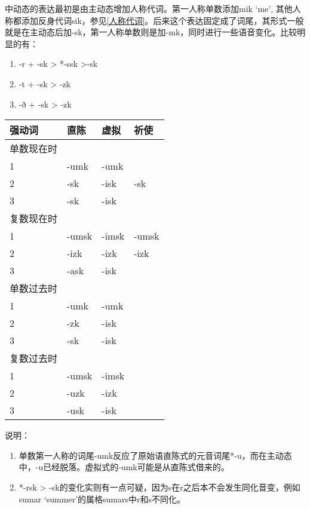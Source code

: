 中动态的表达最初是由主动态增加人称代词。第一人称单数添加mik `me',
其他人称都添加反身代词sik，参见\ref{人称代词}。后来这个表达固定成了词尾，其形式一般就是在主动态后加-sk，第一人称单数则是加-mk，同时进行一些语音变化。比较明显的有：

\begin{enumerate}
  \def\labelenumi{\arabic{enumi})}
  \item
        -r + -sk \textgreater{} *-ssk \textgreater-sk
  \item
        -t + -sk \textgreater{} -zk
  \item
        -ð + -sk \textgreater{} -zk
\end{enumerate}

\begin{longtable}{llll}
  \toprule
  强动词     & 直陈  & 虚拟  & 祈使  \\
  \midrule
  \endhead
  \bottomrule
  \endfoot
  单数现在时 &       &       &       \\
  1          & -umk  & -umk  &       \\
  2          & -sk   & -isk  & -sk   \\
  3          & -sk   & -isk  &       \\
  复数现在时 &       &       &       \\
  1          & -umsk & -imsk & -umsk \\
  2          & -izk  & -izk  & -izk  \\
  3          & -ask  & -isk  &       \\
  单数过去时 &       &       &       \\
  1          & -umk  & -umk  &       \\
  2          & -zk   & -isk  &       \\
  3          & -sk   & -isk  &       \\
  复数过去时 &       &       &       \\
  1          & -umsk & -imsk &       \\
  2          & -uzk  & -izk  &       \\
  3          & -usk  & -isk  &       \\
\end{longtable}

说明：

\begin{enumerate}
  \def\labelenumi{\arabic{enumi})}
  \item
        单数第一人称的词尾-umk反应了原始语直陈式的元音词尾*-u，而在主动态中，-u已经脱落。虚拟式的-umk可能是从直陈式借来的。
  \item
        *-rsk \textgreater{}
        -sk的变化实则有一点可疑，因为s在r之后本不会发生同化音变，例如sumar
        `summer'的属格sumars中r和s不同化。
\end{enumerate}

